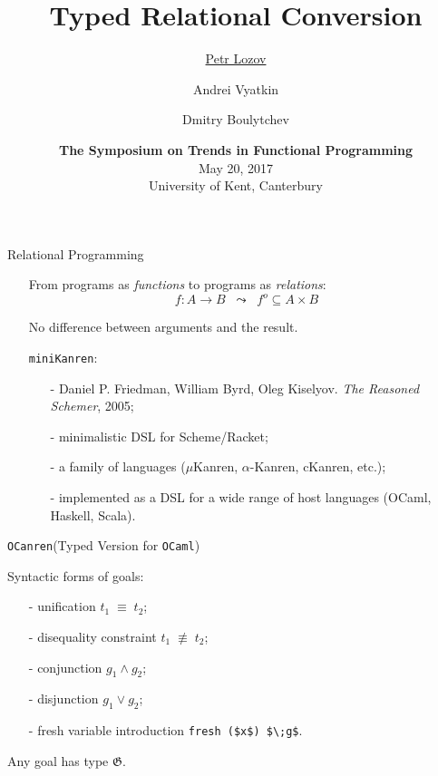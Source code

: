 \documentclass{beamer}
\title{Typed Relational Conversion}
\author{
  \underline{Petr Lozov} \and Andrei Vyatkin \and Dmitry Boulytchev
}
\institute[]{
\small{
\textbf{Saint Petersburg State University $\: $\\JetBrains Research}
}
}
\date{
   \vskip 1cm
   \small{
   \textbf{The Symposium on Trends in Functional Programming}\\
   May 20, 2017 \\
   University of Kent, Canterbury}
}
\newcommand{\goal}{\mathfrak G}
\newcommand{\miniKanren}{\texttt{miniKanren}\xspace}
\newcommand{\ocanren}{\texttt{OCanren}\xspace}
\newcommand{\ocaml}{\texttt{OCaml}\xspace}
\theoremstyle{definition}
\begin{document}
\begin{frame}[plain]
  \titlepage
\end{frame}

\begin{frame}{Relational Programming}

    \begin{itemize}
      \item[] From programs as \emph{functions} to programs as \emph{relations}:
      $$
        f : A\to B\;\; \leadsto \;\;f^o \subseteq A \times B
      $$
      \vskip-2mm
      \pause
      \item[] No difference between arguments and the result.
      \pause
      \vskip4mm
      \item[] \miniKanren:
        \begin{itemize} 
           \item[-] Daniel P. Friedman, William Byrd, Oleg Kiselyov. \emph{The Reasoned Schemer}, 2005;
           \item[-] minimalistic DSL for Scheme/Racket; 
           \item[-] a family of languages ($\mu$Kanren, $\alpha$-Kanren, cKanren, etc.);
           \item[-] implemented as a DSL for a wide range of host languages (OCaml, Haskell, Scala).
        \end{itemize}   
    \end{itemize}


\end{frame}

\begin{frame}[fragile]{\ocanren (Typed Version for \ocaml)}

Syntactic forms of goals:
\begin{itemize}
  \item[-] unification $t_1\;\equiv\;t_2$;
  \item[-] disequality constraint $t_1\;\not\equiv\;t_2$;
  \item[-] conjunction $g_1\wedge g_2$;
  \item[-] disjunction $g_1\vee g_2$;
  \item[-] fresh variable introduction \lstinline{fresh ($x$) $\;g$}.
\end{itemize}

\pause
\vskip5mm
Any goal has type $\goal$.

\end{frame}
\end{document}
